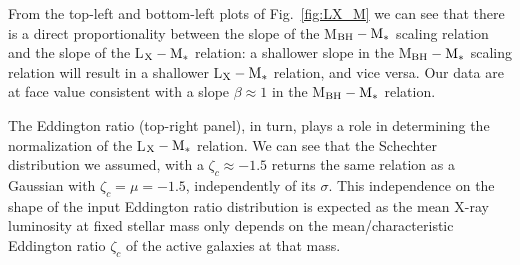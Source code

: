From the top-left and bottom-left plots of Fig.~\ref{fig:LX_M} we can see that there is a direct proportionality between the slope of the  M$_{\rm BH}-{\rm M}_*$ scaling relation and the slope of the L$_{\rm X}-{\rm M}_*$ relation: a shallower slope in the M$_{\rm BH}-{\rm M}_*$ scaling relation will result in a shallower L$_{\rm X}-{\rm M}_*$ relation, and vice versa. Our data are at face value consistent with a slope $\beta\approx 1$ in the M$_{\rm BH}-{\rm M}_*$ relation. 

The Eddington ratio (top-right panel), in turn, plays a role in determining the normalization of the L$_{\rm X}-{\rm M}_*$ relation. We can see that the Schechter distribution we assumed, with a $\zeta_c\approx-1.5$ returns the same relation as a Gaussian with $\zeta_c=\mu=-1.5$, independently of its $\sigma$. This independence on the shape of the input Eddington ratio distribution is expected as the mean X-ray luminosity at fixed stellar mass only depends on the mean/characteristic Eddington ratio $\zeta_c$ of the active galaxies at that mass.  


